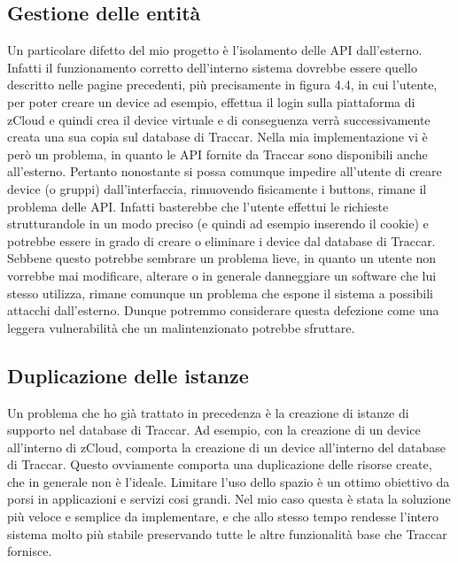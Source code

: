 \documentclass[a4paper,titlepage,12pt]{report}
\begin{document}
{\subsection{
Gestione delle entità}
Un particolare difetto del mio progetto è l'isolamento delle API dall'esterno. Infatti il funzionamento corretto dell'interno sistema dovrebbe essere quello descritto nelle pagine precedenti, più precisamente in figura 4.4, in cui l'utente, per poter creare un device ad esempio, effettua il login sulla piattaforma di zCloud e quindi crea il device virtuale e di conseguenza verrà successivamente creata una sua copia sul database di Traccar. Nella mia implementazione vi è però un problema, in quanto le API fornite da Traccar sono disponibili anche all'esterno. Pertanto nonostante si possa comunque impedire all'utente di creare device (o gruppi) dall'interfaccia, rimuovendo fisicamente i buttons, rimane il problema delle API. Infatti basterebbe che l'utente effettui le richieste strutturandole in un modo preciso (e quindi ad esempio inserendo il cookie) e potrebbe essere in grado di creare o eliminare i device dal database di Traccar.\\
Sebbene questo potrebbe sembrare un problema lieve, in quanto un utente non vorrebbe mai modificare, alterare o in generale danneggiare un software che lui stesso utilizza, rimane comunque un problema che espone il sistema a possibili attacchi dall'esterno. Dunque potremmo considerare questa defezione come una leggera vulnerabilità che un malintenzionato potrebbe sfruttare.


\subsection{
Duplicazione delle istanze}
Un problema che ho già trattato in precedenza è la creazione di istanze di supporto nel database di Traccar. Ad esempio, con la creazione di un device all'interno di zCloud, comporta la creazione di un device all'interno del database di Traccar. Questo ovviamente comporta una duplicazione delle risorse create, che in generale non è l'ideale. Limitare l'uso dello spazio è un ottimo obiettivo da porsi in applicazioni e servizi cosi grandi. Nel mio caso questa è stata la soluzione più veloce e semplice da implementare, e che allo stesso tempo rendesse l'intero sistema molto più stabile preservando tutte le altre funzionalità base che Traccar fornisce.


}
\end{document}

